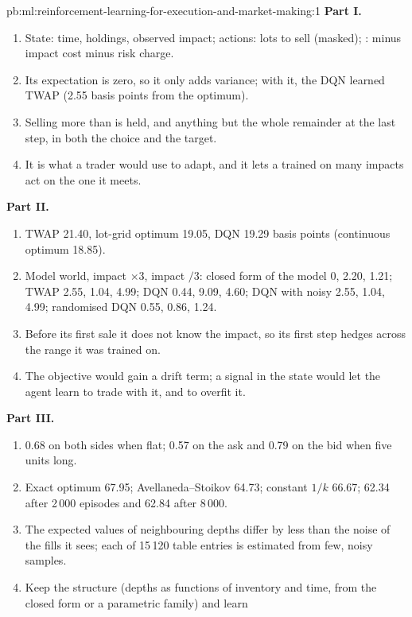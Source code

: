 \begin{solution}{pb:ml:reinforcement-learning-for-execution-and-market-making:1}
\textbf{Part I.}
\begin{enumerate}
\item State: time, holdings, observed impact; actions: lots to sell (masked); : minus impact cost minus risk charge.
\item Its expectation is zero, so it only adds variance; with it, the DQN learned TWAP (2.55 basis points from the optimum).
\item Selling more than is held, and anything but the whole remainder at the last step, in both the choice and the target.
\item It is what a trader would use to adapt, and it lets a  trained on many impacts act on the one it meets.
\end{enumerate}
\textbf{Part II.}
\begin{enumerate}[resume]
\item TWAP 21.40, lot-grid optimum 19.05, DQN 19.29 basis points (continuous optimum 18.85).
\item Model world, impact $\times3$, impact $/3$: closed form of the model 0, 2.20, 1.21; TWAP 2.55, 1.04, 4.99; DQN 0.44, 9.09,
4.60; DQN with noisy  2.55, 1.04, 4.99; randomised DQN 0.55, 0.86, 1.24.
\item Before its first sale it does not know the impact, so its first step hedges across the range it was trained on.
\item The objective would gain a drift term; a signal in the state would let the agent learn to trade with it, and to
overfit it.
\end{enumerate}
\textbf{Part III.}
\begin{enumerate}[resume]
\item 0.68 on both sides when flat; 0.57 on the ask and 0.79 on the bid when five units long.
\item Exact optimum 67.95; Avellaneda--Stoikov 64.73; constant $1/k$ 66.67;  62.34 after 2\,000 episodes and 62.84
after 8\,000.
\item The expected values of neighbouring depths differ by less than the noise of the fills it sees; each of 15\,120 table
entries is estimated from few, noisy samples.
\item Keep the structure (depths as functions of inventory and time, from the closed form or a parametric family) and learn

\end{enumerate}
\end{solution}
